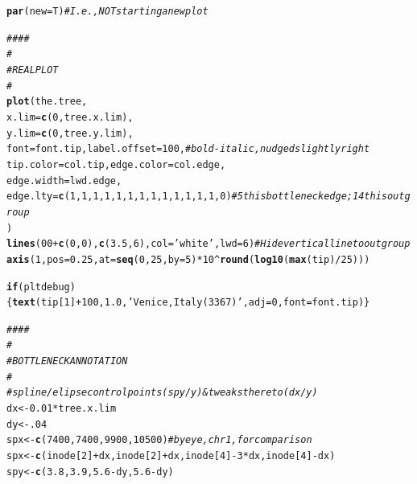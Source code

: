 \documentclass{article}\usepackage[]{graphicx}\usepackage[]{color}
\makeatletter
\newcommand{\hlnum}[1]{\textcolor[rgb]{0.686,0.059,0.569}{#1}}%
\newcommand{\hlstr}[1]{\textcolor[rgb]{0.192,0.494,0.8}{#1}}%
\newcommand{\hlcom}[1]{\textcolor[rgb]{0.678,0.584,0.686}{\textit{#1}}}%
\newcommand{\hlopt}[1]{\textcolor[rgb]{0,0,0}{#1}}%
\newcommand{\hlstd}[1]{\textcolor[rgb]{0.345,0.345,0.345}{#1}}%
\newcommand{\hlkwa}[1]{\textcolor[rgb]{0.161,0.373,0.58}{\textbf{#1}}}%
\newcommand{\hlkwb}[1]{\textcolor[rgb]{0.69,0.353,0.396}{#1}}%
\newcommand{\hlkwc}[1]{\textcolor[rgb]{0.333,0.667,0.333}{#1}}%
\newcommand{\hlkwd}[1]{\textcolor[rgb]{0.737,0.353,0.396}{\textbf{#1}}}%
\newenvironment{kframe}{%
 \def\at@end@of@kframe{}%
 \ifinner\ifhmode%
  \def\at@end@of@kframe{\end{minipage}}%
  \begin{minipage}{\columnwidth}%
 \fi\fi%
 \def\FrameCommand##1{\hskip\@totalleftmargin \hskip-\fboxsep
 \colorbox{shadecolor}{##1}\hskip-\fboxsep
     \hskip-\linewidth \hskip-\@totalleftmargin \hskip\columnwidth}%
 \MakeFramed {\advance\hsize-\width
   \@totalleftmargin\z@ \linewidth\hsize
   \@setminipage}}%
 {\par\unskip\endMakeFramed%
 \at@end@of@kframe}
\newenvironment{knitrout}{}{} %
\makeatother
\begin{document}
\begin{knitrout}
\begin{kframe}
\begin{alltt}
  \hlkwd{par}\hlstd{(}\hlkwc{new}\hlstd{=T)}  \hlcom{# I.e., NOT starting a new plot}

  \hlcom{####}
  \hlcom{#}
  \hlcom{# REAL PLOT}
  \hlcom{#}
  \hlkwd{plot}\hlstd{(the.tree,}
       \hlkwc{x.lim} \hlstd{=} \hlkwd{c}\hlstd{(}\hlnum{0}\hlstd{, tree.x.lim),}
       \hlkwc{y.lim} \hlstd{=} \hlkwd{c}\hlstd{(}\hlnum{0}\hlstd{, tree.y.lim),}
       \hlkwc{font}\hlstd{=font.tip,} \hlkwc{label.offset}\hlstd{=}\hlnum{100}\hlstd{,}             \hlcom{# bold-italic, nudged slightly right}
       \hlkwc{tip.color}\hlstd{=col.tip,} \hlkwc{edge.color}\hlstd{=col.edge,}
       \hlkwc{edge.width}\hlstd{=lwd.edge,}
       \hlkwc{edge.lty}\hlstd{=}\hlkwd{c}\hlstd{(}\hlnum{1}\hlstd{,}\hlnum{1}\hlstd{,}\hlnum{1}\hlstd{,}\hlnum{1}\hlstd{,} \hlnum{1} \hlstd{,}\hlnum{1}\hlstd{,}\hlnum{1}\hlstd{,}\hlnum{1}\hlstd{,}\hlnum{1}\hlstd{,}\hlnum{1}\hlstd{,}\hlnum{1}\hlstd{,}\hlnum{1}\hlstd{,}\hlnum{1}\hlstd{,}\hlnum{0}\hlstd{)}    \hlcom{# 5th is bottleneck edge; 14th is outgroup}
      \hlstd{)}
  \hlkwd{lines}\hlstd{(}\hlnum{00}\hlopt{+}\hlkwd{c}\hlstd{(}\hlnum{0}\hlstd{,}\hlnum{0}\hlstd{),}\hlkwd{c}\hlstd{(}\hlnum{3.5}\hlstd{,}\hlnum{6}\hlstd{),}\hlkwc{col}\hlstd{=}\hlstr{'white'}\hlstd{,}\hlkwc{lwd}\hlstd{=}\hlnum{6}\hlstd{)}       \hlcom{# Hide vertical line to outgroup}
  \hlkwd{axis}\hlstd{(}\hlnum{1}\hlstd{,} \hlkwc{pos}\hlstd{=}\hlnum{0.25}\hlstd{,} \hlkwc{at}\hlstd{=}\hlkwd{seq}\hlstd{(}\hlnum{0}\hlstd{,}\hlnum{25}\hlstd{,}\hlkwc{by}\hlstd{=}\hlnum{5}\hlstd{)}\hlopt{*}\hlnum{10}\hlopt{^}\hlkwd{round}\hlstd{(}\hlkwd{log10}\hlstd{(}\hlkwd{max}\hlstd{(tip)}\hlopt{/}\hlnum{25}\hlstd{)))}

  \hlkwa{if}\hlstd{(pltdebug)\{}\hlkwd{text}\hlstd{(tip[}\hlnum{1}\hlstd{]}\hlopt{+}\hlnum{100}\hlstd{,} \hlnum{1.0}\hlstd{,} \hlstr{'Venice, Italy (3367)'}\hlstd{,} \hlkwc{adj}\hlstd{=}\hlnum{0}\hlstd{,} \hlkwc{font}\hlstd{=font.tip)\}}

  \hlcom{####}
  \hlcom{#}
  \hlcom{# BOTTLENECK ANNOTATION}
  \hlcom{#}
  \hlcom{# spline/elipse control points (spy/y) & tweaks thereto (dx/y)}
  \hlstd{dx} \hlkwb{<-} \hlnum{0.01} \hlopt{*} \hlstd{tree.x.lim}
  \hlstd{dy} \hlkwb{<-} \hlnum{.04}
  \hlstd{spx} \hlkwb{<-} \hlkwd{c}\hlstd{(}\hlnum{7400}\hlstd{,} \hlnum{7400}\hlstd{,} \hlnum{9900}\hlstd{,} \hlnum{10500}\hlstd{)} \hlcom{# by eye, chr1, for comparison}
  \hlstd{spx} \hlkwb{<-} \hlkwd{c}\hlstd{(inode[}\hlnum{2}\hlstd{]}\hlopt{+}\hlstd{dx,inode[}\hlnum{2}\hlstd{]}\hlopt{+}\hlstd{dx,inode[}\hlnum{4}\hlstd{]}\hlopt{-}\hlnum{3}\hlopt{*}\hlstd{dx,inode[}\hlnum{4}\hlstd{]}\hlopt{-}\hlstd{dx)}
  \hlstd{spy} \hlkwb{<-} \hlkwd{c}\hlstd{(} \hlnum{3.8}\hlstd{,}  \hlnum{3.9}\hlstd{,}  \hlnum{5.6}\hlopt{-}\hlstd{dy,}   \hlnum{5.6}\hlopt{-}\hlstd{dy)}


\end{alltt}
\end{kframe}
\end{knitrout}
\end{document}
